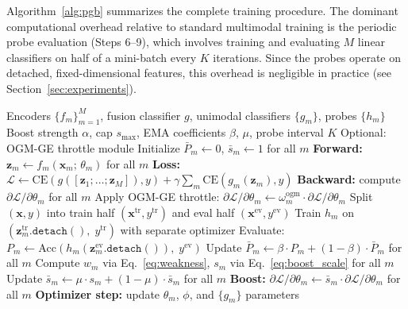 \documentclass{article}
\newcommand{\loss}{\mathcal{L}}
\newcommand{\encoder}{f}
\newcommand{\probe}{h}
\begin{document}
Algorithm~\ref{alg:pgb} summarizes the complete training procedure. The dominant computational overhead relative to standard multimodal training is the periodic probe evaluation (Steps 6--9), which involves training and evaluating $M$ linear classifiers on half of a mini-batch every $K$ iterations. Since the probes operate on detached, fixed-dimensional features, this overhead is negligible in practice (see Section~\ref{sec:experiments}).

\begin{algorithm}[t]
\caption{Probe-Guided Gradient Boosting}
\label{alg:pgb}
\begin{algorithmic}[1]
\REQUIRE Encoders $\{\encoder_m\}_{m=1}^M$, fusion classifier $g$, unimodal classifiers $\{g_m\}$, probes $\{\probe_m\}$
\REQUIRE Boost strength $\alpha$, cap $s_{\max}$, EMA coefficients $\beta$, $\mu$, probe interval $K$
\REQUIRE Optional: OGM-GE throttle module
\STATE Initialize $\bar{P}_m \leftarrow 0$, $\bar{s}_m \leftarrow 1$ for all $m$
    \STATE \textbf{Forward:} $\mathbf{z}_m \leftarrow \encoder_m(\mathbf{x}_m;\,\theta_m)$ for all $m$
    \STATE \textbf{Loss:} $\loss \leftarrow \mathrm{CE}(g([\mathbf{z}_1;\ldots;\mathbf{z}_M]), y) + \gamma \sum_m \mathrm{CE}(g_m(\mathbf{z}_m), y)$
    \STATE \textbf{Backward:} compute $\partial\loss/\partial\theta_m$ for all $m$
        \STATE Apply OGM-GE throttle: $\partial\loss/\partial\theta_m \leftarrow \omega_m^{\text{ogm}} \cdot \partial\loss/\partial\theta_m$
    \ENDIF
        \STATE Split $(\mathbf{x}, y)$ into train half $(\mathbf{x}^{\text{tr}}, y^{\text{tr}})$ and eval half $(\mathbf{x}^{\text{ev}}, y^{\text{ev}})$
            \STATE Train $\probe_m$ on $(\mathbf{z}_m^{\text{tr}}.\texttt{detach}(),\; y^{\text{tr}})$ with separate optimizer
            \STATE Evaluate: $P_m \leftarrow \text{Acc}(\probe_m(\mathbf{z}_m^{\text{ev}}.\texttt{detach}()),\; y^{\text{ev}})$
        \ENDFOR
        \STATE Update $\bar{P}_m \leftarrow \beta \cdot P_m + (1-\beta) \cdot \bar{P}_m$ for all $m$
        \STATE Compute $w_m$ via Eq.~\eqref{eq:weakness}, $s_m$ via Eq.~\eqref{eq:boost_scale} for all $m$
        \STATE Update $\bar{s}_m \leftarrow \mu \cdot s_m + (1-\mu) \cdot \bar{s}_m$ for all $m$
    \ENDIF
    \STATE \textbf{Boost:} $\partial\loss/\partial\theta_m \leftarrow \bar{s}_m \cdot \partial\loss/\partial\theta_m$ for all $m$
    \STATE \textbf{Optimizer step:} update $\theta_m$, $\phi$, and $\{g_m\}$ parameters
\ENDFOR
\end{algorithmic}
\end{algorithm}
\end{document}
